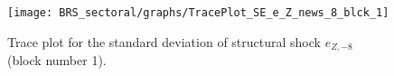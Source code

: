 \begin{figure}[H]
\centering
  \texttt{[image: BRS\_sectoral/graphs/TracePlot\_SE\_e\_Z\_news\_8\_blck\_1]}\\
    \caption{Trace plot for the standard deviation of structural shock ${e_{Z,-8}}$ (block number 1).}
\end{figure}
